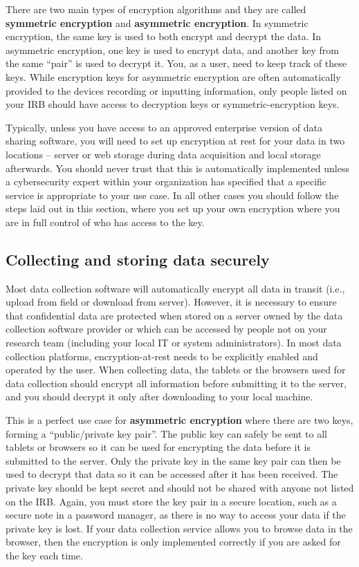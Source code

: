 There are two main types of encryption algorithms and they are called
\textbf{symmetric encryption}
and \textbf{asymmetric encryption}.
In symmetric encryption,
the same key is used to both encrypt and decrypt the data.
In asymmetric encryption, one key is used to encrypt data,
and another key from the same ``pair'' is used to decrypt it.
You, as a user, need to keep track of these keys.
While encryption keys for asymmetric encryption are often
automatically provided to the devices recording or inputting information,
only people listed on your IRB should have access to decryption keys
or symmetric-encryption keys.

Typically, unless you have access to an approved
enterprise version of data sharing software,
you will need to set up encryption at rest for your data
in two locations --
server or web storage during data acquisition and local storage afterwards.
You should never trust that this is automatically implemented
unless a cybersecurity expert within your organization
has specified that a specific service is appropriate to your use case.
In all other cases you should follow the steps laid out in this section,
where you set up your own encryption
where you are in full control of who has access to the key.

\subsection{Collecting and storing data securely}

Most data collection software will automatically encrypt
all data in transit (i.e., upload from field or download from server).
However, it is necessary to ensure that confidential data
are protected when stored on a server
owned by the data collection software provider
or which can be accessed by people not on your research team
(including your local IT or system administrators).
In most data collection platforms,
encryption-at-rest needs to be explicitly enabled and operated by the user.
When collecting data, the tablets or the browsers used for data collection
should encrypt all information before submitting it to the server,
and you should decrypt it only after downloading to your local machine.

This is a perfect use case for \textbf{asymmetric encryption}
where there are two keys, forming a ``public/private key pair''.
The public key can safely be sent to all tablets or browsers
so it can be used for encrypting the data before it is submitted to the server.
Only the private key in the same key pair can then be used to decrypt that data
so it can be accessed after it has been received.
The private key should be kept secret and
should not be shared with anyone not listed on the IRB.
Again, you must store the key pair in a secure location,
such as a secure note in a password manager,
as there is no way to access your data if the private key is lost.
If your data collection service allows you to browse data in the browser,
then the encryption is only implemented correctly if you are asked for the key each time.

